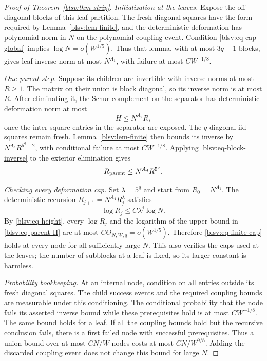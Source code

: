 \documentclass[11pt,reqno]{amsart}
\numberwithin{equation}{section}
\theoremstyle{plain}
\theoremstyle{definition}
\theoremstyle{remark}
\begin{document}
\begin{proof}[Proof of Theorem~\ref{blsv:thm-strip}]
\smallskip\noindent\emph{Initialization at the leaves.}
Expose the off-diagonal blocks of this leaf partition. The fresh
diagonal squares have the form required by Lemma~\ref{blsv:lem-finite},
and the deterministic deformation has polynomial norm in $N$ on the
polynomial coupling event. Condition \eqref{blsv:eq-cap-global} implies
$\log N=o(W^{1/5})$. Thus that lemma, with at most $3q+1$ blocks, gives
leaf inverse norm at most $N^{A_1}$, with failure at most $CW^{-1/8}$.

\smallskip\noindent\emph{One parent step.}
Suppose its children are invertible with inverse norms at most $R\ge1$.
The matrix on their union is block diagonal, so its inverse norm is at
most $R$. After eliminating it, the Schur complement on the separator
has deterministic deformation norm at most
\begin{equation}\label{blsv:eq-parent-H}
 H\le N^{A_2}R,
\end{equation}
once the inter-square entries in the separator are exposed.
The $q$ diagonal iid squares remain fresh. Lemma~\ref{blsv:lem-finite}
then bounds its inverse by $N^{A_3}R^{5^q-2}$, with conditional failure
at most $CW^{-1/8}$. Applying \eqref{blsv:eq-block-inverse} to the
exterior elimination gives
\begin{equation}\label{blsv:eq-parent-recurrence}
 R_{\rm parent}\le N^{A_4}R^{5^q}.
\end{equation}

\smallskip\noindent\emph{Checking every deformation cap.}
Set $\lambda=5^q$ and start from $R_0=N^{A_1}$. The deterministic
recursion $R_{j+1}=N^{A_4}R_j^\lambda$ satisfies
\[
 \log R_j\le C\lambda^j\log N.
\]
By \eqref{blsv:eq-height}, every $\log R_j$ and the logarithm of the
upper bound in \eqref{blsv:eq-parent-H} are at most
$C\Theta_{N,W,q}=o(W^{1/5})$. Therefore
\eqref{blsv:eq-finite-cap} holds at every node for all sufficiently
large $N$. This also verifies the caps used at the leaves; the number
of subblocks at a leaf is fixed, so its larger constant is harmless.

\smallskip\noindent\emph{Probability bookkeeping.}
At an internal node, condition on all entries outside its fresh diagonal
squares. The child success events and the required coupling bounds are
measurable under this conditioning. The conditional probability that
the node fails its asserted inverse bound while these prerequisites
hold is at most $CW^{-1/8}$. The same bound holds for a leaf.
If all the coupling bounds hold but the recursive conclusion fails,
there is a first failed node with successful prerequisites.
Thus a union bound over at most $CN/W$ nodes costs at most
$CN/W^{9/8}$. Adding the discarded coupling event does not change this
bound for large $N$.


\end{proof}
\end{document}
